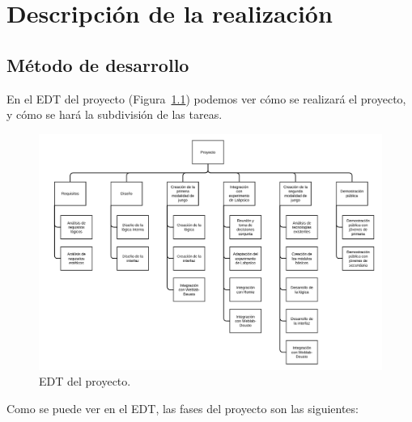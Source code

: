 \chapter{Descripción de la realización}

\section{Método de desarrollo}

En el EDT del proyecto (Figura~\ref{fig:edt}) podemos ver cómo se realizará el proyecto, y cómo se hará la subdivisión de las tareas.

\begin{figure}
	\centering
	\includegraphics[height=\textwidth, angle=-90]{fig/edt}
	\caption{EDT del proyecto.}\label{fig:edt}
\end{figure}

Como se puede ver en el EDT, las fases del proyecto son las siguientes:


